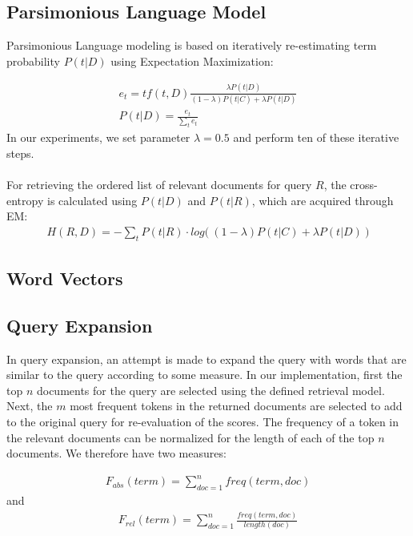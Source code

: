 \documentclass{article}
\begin{document}
\subsection*{Parsimonious Language Model}

Parsimonious Language modeling is based on iteratively re-estimating term probability $P(t|D)$ using Expectation Maximization:

\begin{align*}
e_t = tf(t,D)\frac{\lambda P(t|D)}{(1-\lambda)P(t|C)+\lambda P(t|D)} \\
P(t|D) = \frac{e_t}{\sum_t e_t}
\end{align*}
In our experiments, we set parameter $\lambda = 0.5$ and perform ten of these iterative steps.\\ \\
For retrieving the ordered list of relevant documents for query $R$, the cross-entropy is calculated using $P(t|D)$ and $P(t|R)$, which are acquired through EM:
\begin{align*}
H(R,D) = -\sum_t P(t|R)\cdot log\big( \ (1-\lambda)P(t|C)+\lambda P(t|D) \ \big)
\end{align*}

\subsection{Word Vectors}



\subsection*{Query Expansion}
In query expansion, an attempt is made to expand the query with words that are similar to the query according to some measure. In our implementation, first the top $n$ documents for the query are selected using the defined retrieval model. Next, the $m$ most frequent tokens in the returned documents are selected to add to the original query for re-evaluation of the scores. The frequency of a token in the relevant documents can be normalized for the length of each of the top $n$ documents. We therefore have two measures:

\begin{align*}
F_{abs}(term) = \sum_{doc=1}^{n}freq(term,doc)
\end{align*}
and
\begin{align*}
F_{rel}(term) = \sum_{doc=1}^{n}\frac{freq(term,doc)}{length(doc)}
\end{align*}
\end{document}
